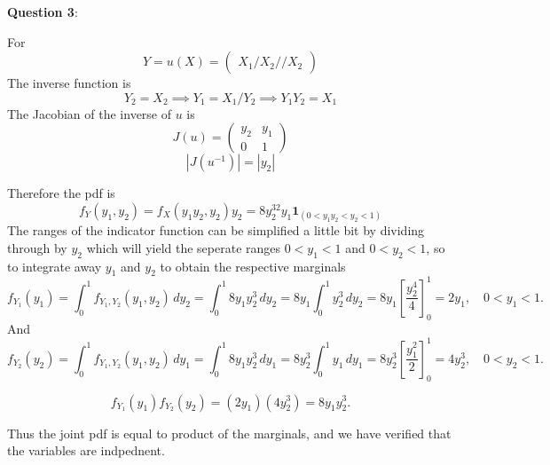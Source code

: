 \documentclass{article} %
\newcommand{\question}[2][]{
  \begin{flushleft}
    \textbf{Question #1}: \textit{#2}

\end{flushleft}}
\begin{document}
\question[3]{ }
For
\[
  Y = u(X) =
  \begin{pmatrix}
    X_1/X_2 // X_2
  \end{pmatrix}
\]
The inverse function is
$$
Y_2 = X_2 \implies Y_1 = X_1/Y_2 \implies Y_1Y_2 = X_1
$$
The Jacobian of the inverse of $u$ is
$$
J(u) =
\begin{pmatrix}
  y_2 & y_1 \\
  0 & 1
\end{pmatrix}
$$
\[
  \left|J(u^{-1})\right| = |y_2|
\]

Therefore the pdf is
\[
  f_Y(y_1, y_2) = f_X(y_1y_2, y_2)y_2 = 8y_2^32y_1\mathbf{1}_{(0 <
  y_1y_2 < y_2 < 1)}
\]
The ranges of the indicator function can be simplified a little bit
by dividing through by $y_2$ which will yield the seperate ranges $0
< y_1 < 1$ and $0 < y_2 < 1$, so to integrate away $y_1$ and $y_2$ to
obtain the respective marginals
\[
  f_{Y_1}(y_1)
  = \int_0^1 f_{Y_1,Y_2}(y_1,y_2)\,dy_2
  = \int_0^1 8y_1 y_2^3 \, dy_2
  = 8y_1 \int_0^1 y_2^3 \, dy_2
  = 8y_1 \left[\frac{y_2^4}{4}\right]_0^1
  = 2y_1, \quad 0<y_1<1.
\]
And
\[
  f_{Y_2}(y_2)
  = \int_0^1 f_{Y_1,Y_2}(y_1,y_2)\,dy_1
  = \int_0^1 8y_1 y_2^3 \, dy_1
  = 8y_2^3 \int_0^1 y_1 \, dy_1
  = 8y_2^3 \left[\frac{y_1^2}{2}\right]_0^1
  = 4y_2^3, \quad 0<y_2<1.
\]

\[
  f_{Y_1}(y_1)f_{Y_2}(y_2)
  = (2y_1)(4y_2^3)
  = 8y_1y_2^3.
\]

Thus the joint pdf is equal to product of the marginals, and we have
verified that the variables are indpednent.
\end{document}
